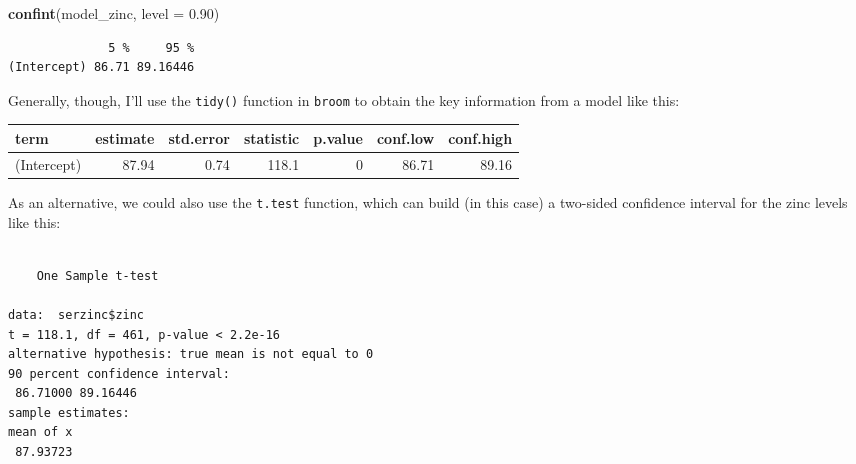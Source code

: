 \documentclass[
]{book}
\newenvironment{Shaded}{\begin{snugshade}}{\end{snugshade}}
\newcommand{\DataTypeTok}[1]{\textcolor[rgb]{0.13,0.29,0.53}{#1}}
\newcommand{\DecValTok}[1]{\textcolor[rgb]{0.00,0.00,0.81}{#1}}
\newcommand{\FloatTok}[1]{\textcolor[rgb]{0.00,0.00,0.81}{#1}}
\newcommand{\KeywordTok}[1]{\textcolor[rgb]{0.13,0.29,0.53}{\textbf{#1}}}
\newcommand{\NormalTok}[1]{#1}
\newcommand{\OperatorTok}[1]{\textcolor[rgb]{0.81,0.36,0.00}{\textbf{#1}}}
\newcommand{\OtherTok}[1]{\textcolor[rgb]{0.56,0.35,0.01}{#1}}
\newcommand{\StringTok}[1]{\textcolor[rgb]{0.31,0.60,0.02}{#1}}
\begin{document}
\begin{Shaded}
\begin{Highlighting}[]
\KeywordTok{confint}\NormalTok{(model_zinc, }\DataTypeTok{level =} \FloatTok{0.90}\NormalTok{)}
\end{Highlighting}
\end{Shaded}

\begin{verbatim}
              5 %     95 %
(Intercept) 86.71 89.16446
\end{verbatim}

Generally, though, I'll use the \texttt{tidy()} function in \texttt{broom} to obtain the key information from a model like this:

\begin{Shaded}
\end{Shaded}

\begin{tabular}{l|r|r|r|r|r|r}
\hline
term & estimate & std.error & statistic & p.value & conf.low & conf.high\\
\hline
(Intercept) & 87.94 & 0.74 & 118.1 & 0 & 86.71 & 89.16\\
\hline
\end{tabular}

As an alternative, we could also use the \texttt{t.test} function, which can build (in this case) a two-sided confidence interval for the zinc levels like this:

\begin{Shaded}
\end{Shaded}

\begin{verbatim}

	One Sample t-test

data:  serzinc$zinc
t = 118.1, df = 461, p-value < 2.2e-16
alternative hypothesis: true mean is not equal to 0
90 percent confidence interval:
 86.71000 89.16446
sample estimates:
mean of x 
 87.93723 
\end{verbatim}
\end{document}
